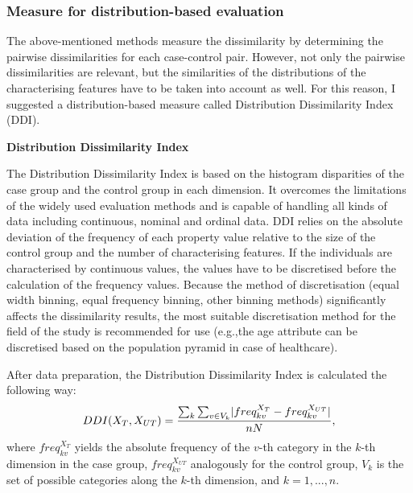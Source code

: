 

\subsubsection{Measure for distribution-based evaluation}
\label{subseq:nonpaired}

The above-mentioned methods measure the dissimilarity by determining the pairwise dissimilarities for each case-control pair. However, not only the pairwise dissimilarities are relevant, but the similarities of the distributions of the characterising features have to be taken into account as well. For this reason, I suggested a distribution-based measure called Distribution Dissimilarity Index (DDI).

\vspace{0.5cm}
\noindent\textbf{Distribution Dissimilarity Index}

\noindent The Distribution Dissimilarity Index is based on the histogram disparities of the case group and the control group in each dimension. It overcomes the limitations of the widely used evaluation methods and is capable of handling all kinds of data including continuous, nominal and ordinal data. DDI relies on the absolute deviation of the frequency of each property value relative to the size of the control group and the number of characterising features. If the individuals are characterised by continuous values, the values have to be discretised before the calculation of the frequency values. Because the method of discretisation (equal width binning, equal frequency binning, other binning methods) significantly affects the dissimilarity results, the most suitable discretisation method for the field of the study is recommended for use (e.g.,the age attribute can be discretised based on the population pyramid in case of healthcare).

After data preparation, the Distribution Dissimilarity Index is calculated the following way:
\begin{equation}
	DDI(X_T,X_{UT})=\frac{\sum_k\sum_{v\in V_k}\lvert freq^{X_T}_{kv} - freq^{X_{UT}}_{kv}\rvert}{nN},
	\label{eq:ddi}
\end{equation}
where $freq^{X_T}_{kv}$ yields the absolute frequency of the $v$-th category in the $k$-th dimension in the case group, $freq^{X_{UT}}_{kv}$ analogously for the control group, $V_k$ is the set of possible categories along the $k$-th dimension, and $k=1,...,n$.

